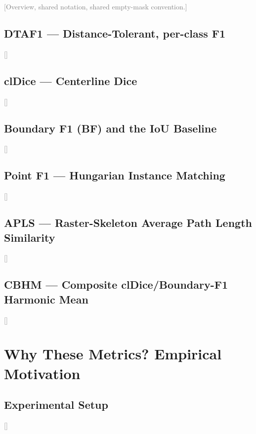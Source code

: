 \documentclass[sigconf]{acmart}
\newcommand{\tbd}[1]{\textcolor{gray}{[#1]}}
\begin{document}
\tbd{Overview, shared notation, shared empty-mask convention.}

\subsection{DTAF1 --- Distance-Tolerant, per-class F1}
\label{subsec:dtaf1}
\tbd{}

\subsection{clDice --- Centerline Dice}
\label{subsec:cldice}
\tbd{}

\subsection{Boundary F1 (BF) and the IoU Baseline}
\label{subsec:bf}
\tbd{}

\subsection{Point F1 --- Hungarian Instance Matching}
\label{subsec:pointf1}
\tbd{}

\subsection{APLS --- Raster-Skeleton Average Path Length Similarity}
\label{subsec:apls}
\tbd{}

\subsection{CBHM --- Composite clDice/Boundary-F1 Harmonic Mean}
\label{subsec:cbhm}
\tbd{}

\section{Why These Metrics? Empirical Motivation}
\label{sec:motivation}

\subsection{Experimental Setup}
\label{subsec:motivation-setup}
\tbd{}
\end{document}
